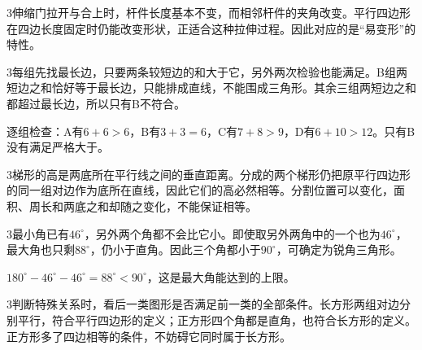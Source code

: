 \documentclass[multi=snippet,border={5bp 20bp 5bp 5bp}]{standalone}
\newenvironment{snippet}[3]{\begin{minipage}{#1bp}\color{answerred}\fontsize{#2}{#3}\selectfont\raggedright}{\end{minipage}}
\begin{document}
\begin{snippet}{505}{11.5}{14}\begin{multicols}{3}\raggedcolumns 伸缩门拉开与合上时，杆件长度基本不变，而相邻杆件的夹角改变。平行四边形在四边长度固定时仍能改变形状，正适合这种拉伸过程。因此对应的是“易变形”的特性。\end{multicols}\end{snippet}
\begin{snippet}{505}{11.5}{14}\begin{multicols}{3}\raggedcolumns 每组先找最长边，只要两条较短边的和大于它，另外两次检验也能满足。B组两短边之和恰好等于最长边，只能排成直线，不能围成三角形。其余三组两短边之和都超过最长边，所以只有B不符合。\par 逐组检查：A有\(6+6>6\)\allowbreak ，B有\(3+3=6\)\allowbreak ，C有\(7+8>9\)\allowbreak ，D有\(6+10>12\)\allowbreak 。只有B没有满足严格大于。\end{multicols}\end{snippet}
\begin{snippet}{505}{11.5}{14}\begin{multicols}{3}\raggedcolumns 梯形的高是两底所在平行线之间的垂直距离。分成的两个梯形仍把原平行四边形的同一组对边作为底所在直线，因此它们的高必然相等。分割位置可以变化，面积、周长和两底之和却随之变化，不能保证相等。\end{multicols}\end{snippet}
\begin{snippet}{505}{11.5}{14}\begin{multicols}{3}\raggedcolumns 最小角已有\(46^\circ\)\allowbreak ，另外两个角都不会比它小。即使取另外两角中的一个也为\(46^\circ\)\allowbreak ，最大角也只剩\(88^\circ\)\allowbreak ，仍小于直角。因此三个角都小于\(90^\circ\)\allowbreak ，可确定为锐角三角形。\par \(180^\circ-46^\circ-46^\circ=88^\circ<90^\circ\)\allowbreak ，这是最大角能达到的上限。\end{multicols}\end{snippet}
\begin{snippet}{505}{11.5}{14}\begin{multicols}{3}\raggedcolumns 判断特殊关系时，看后一类图形是否满足前一类的全部条件。长方形两组对边分别平行，符合平行四边形的定义；正方形四个角都是直角，也符合长方形的定义。正方形多了四边相等的条件，不妨碍它同时属于长方形。\end{multicols}\end{snippet}
\end{document}
